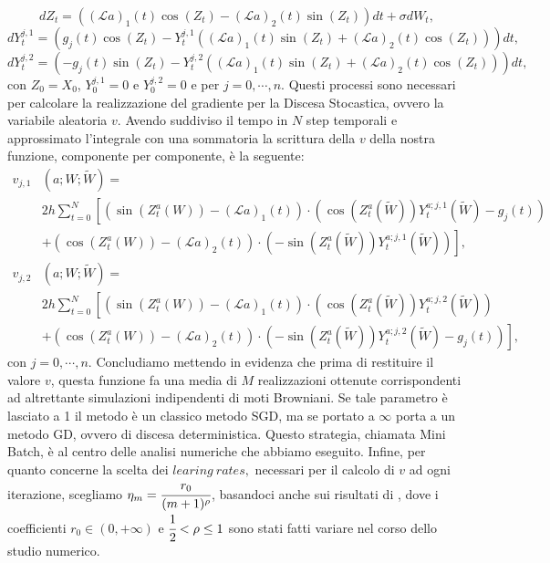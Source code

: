 \documentclass[a4paper,11pt,openright]{report}
\begin{document}
\begin{itemize}
\[
dZ_t = \left( (\mathcal{L}a)_1(t) \cos(Z_t) - (\mathcal{L}a)_2(t) \sin(Z_t) \right) dt + \sigma dW_t, 
\]
\[
dY^{j,1}_t = \left( g_j(t) \cos(Z_t) - Y^{j,1}_t \left( (\mathcal{L}a)_1(t)\sin(Z_t) + (\mathcal{L}a)_2(t)\cos(Z_t)\right) \right)dt, 
\]
\[
dY^{j,2}_t = \left( -g_j(t) \sin(Z_t) - Y^{j,2}_t \left( (\mathcal{L}a)_1(t)\sin(Z_t) + (\mathcal{L}a)_2(t)\cos(Z_t)\right) \right)dt, 
\]
con $Z_0 = X_0$, $Y^{j,1}_0 = 0 $ e $Y^{j,2}_0 = 0$ e per $j = 0, \cdots , n$. Questi processi sono necessari per calcolare la realizzazione del gradiente per la Discesa Stocastica, ovvero la variabile aleatoria $v$. Avendo suddiviso il tempo in $N$ step temporali e  approssimato l'integrale con una sommatoria la scrittura della $v$ della nostra funzione, componente per componente, è la seguente:
\begin{align*}
v_{j,1}&(a; W; \tilde{W}) = \\
&2 h \sum_{t=0}^{N} \left[ \left( \sin(Z^a_t(W)) - (\mathcal{L}a)_1(t) \right) \cdot \left( \cos(Z^a_t(\tilde{W})) Y_t^{a;j,1}(\tilde{W}) - g_j(t) \right) \right.\\
&\left.+ \left( \cos(Z^a_t(W)) - (\mathcal{L}a)_2(t) \right) \cdot \left( -\sin(Z^a_t(\tilde{W})) Y_t^{a;j,1}(\tilde{W}) \right)\right],
\end{align*}
\begin{align*}
v_{j,2}&(a; W; \tilde{W}) = \\
&2 h \sum_{t=0}^{N} \left[ \left( \sin(Z^a_t(W)) - (\mathcal{L}a)_1(t) \right) \cdot \left( \cos(Z^a_t(\tilde{W})) Y_t^{a;j,2}(\tilde{W}) \right) \right.\\
&\left.+ \left( \cos(Z^a_t(W)) - (\mathcal{L}a)_2(t) \right) \cdot \left( -\sin(Z^a_t(\tilde{W})) Y_t^{a;j,2}(\tilde{W}) - g_j(t) \right)\right],
\end{align*}
con $j = 0, \cdots , n$.
Concludiamo mettendo in evidenza che prima di restituire il valore $v$, questa funzione fa una media di $M$ realizzazioni ottenute corrispondenti ad altrettante simulazioni indipendenti di moti Browniani. Se tale parametro è lasciato a 1 il metodo è un classico metodo SGD, ma se portato a $\infty$ porta a un metodo GD, ovvero di discesa deterministica. Questo strategia, chiamata Mini Batch, è al centro delle analisi numeriche che abbiamo eseguito. Infine, per quanto concerne la scelta dei $learing \ rates,$ necessari per il calcolo di $v$ ad ogni iterazione, scegliamo $\eta_m = \cfrac{r_0}{(m + 1)^\rho}$, basandoci anche sui risultati di \cite{fehrman2020convergence}, dove i coefficienti $r_0 \in (0, +\infty)$ e $\cfrac{1}{2} < \rho \leq 1$ sono stati fatti variare nel corso dello studio numerico. 
\end{itemize}
\end{document}
